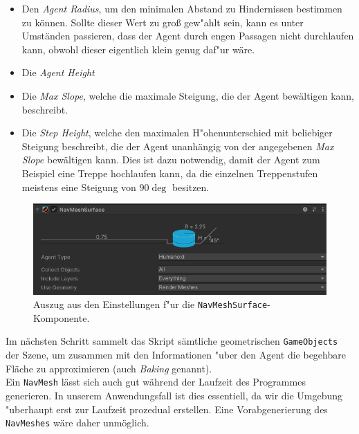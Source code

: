 \begin{itemize}
	\item Den \textit{Agent Radius}, um den minimalen Abstand zu Hindernissen bestimmen zu können. Sollte dieser Wert zu groß gew"ahlt sein, kann es unter Umständen passieren, dass der Agent durch engen Passagen nicht durchlaufen kann, obwohl dieser eigentlich klein genug daf"ur wäre.
	\item Die \textit{Agent Height}
	\item Die \textit{Max Slope}, welche die maximale Steigung, die der Agent bewältigen kann, beschreibt.
	\item Die \textit{Step Height}, welche den maximalen H"ohenunterschied mit beliebiger Steigung beschreibt, die der Agent unanhängig von der angegebenen \textit{Max Slope} bewältigen kann. Dies ist dazu notwendig, damit der Agent zum Beispiel eine Treppe hochlaufen kann, da die einzelnen Treppenstufen meistens eine Steigung von $90\deg$ besitzen.
\end{itemize}

\begin{figure}
	\centering
	\includegraphics[width=0.8\linewidth]{resources/img/navMesh02.png}
	\caption{Auszug aus den Einstellungen f"ur die \texttt{NavMeshSurface}-Komponente.}
	\label{fig:navMesh02}
\end{figure}

Im nächsten Schritt sammelt das Skript sämtliche geometrischen \texttt{GameObjects} der Szene, um zusammen mit den Informationen "uber den Agent die begehbare Fläche zu approximieren (auch \textit{Baking} genannt).
\\
Ein \texttt{NavMesh} lässt sich auch gut während der Laufzeit des Programmes generieren. In unserem Anwendungsfall ist dies essentiell, da wir die Umgebung "uberhaupt erst zur Laufzeit prozedual erstellen. Eine Vorabgenerierung des \texttt{NavMeshes} wäre daher unmöglich.

